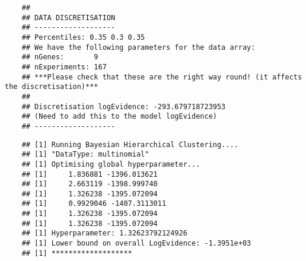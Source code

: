     \begin{Shaded}
    \begin{Highlighting}[]
    \OtherTok{\textless{}{-}} \NormalTok{(}
    \end{Highlighting}
    \end{Shaded}
    
    \begin{verbatim}
    ## 
    ## DATA DISCRETISATION
    ## -------------------
    ## Percentiles: 0.35 0.3 0.35 
    ## We have the following parameters for the data array:
    ## nGenes:       9
    ## nExperiments: 167
    ## ***Please check that these are the right way round! (it affects the discretisation)***
    ## 
    ## Discretisation logEvidence: -293.679718723953
    ## (Need to add this to the model logEvidence)
    ## -------------------
    \end{verbatim}
    
    \begin{Shaded}
    \begin{Highlighting}[]
    \OtherTok{\textless{}{-}} 
    \OtherTok{\textless{}{-}} \NormalTok{)}
    \end{Highlighting}
    \end{Shaded}
    
    \begin{verbatim}
    ## [1] Running Bayesian Hierarchical Clustering....
    ## [1] "DataType: multinomial"
    ## [1] Optimising global hyperparameter...
    ## [1]     1.836881 -1396.013621
    ## [1]     2.663119 -1398.999740
    ## [1]     1.326238 -1395.072094
    ## [1]     0.9929046 -1407.3113011
    ## [1]     1.326238 -1395.072094
    ## [1]     1.326238 -1395.072094
    ## [1] Hyperparameter: 1.32623792124926
    ## [1] Lower bound on overall LogEvidence: -1.3951e+03
    ## [1] *******************
    \end{verbatim}
    
    \begin{Shaded}
    \begin{Highlighting}[]
    \end{Highlighting}
    \end{Shaded}
